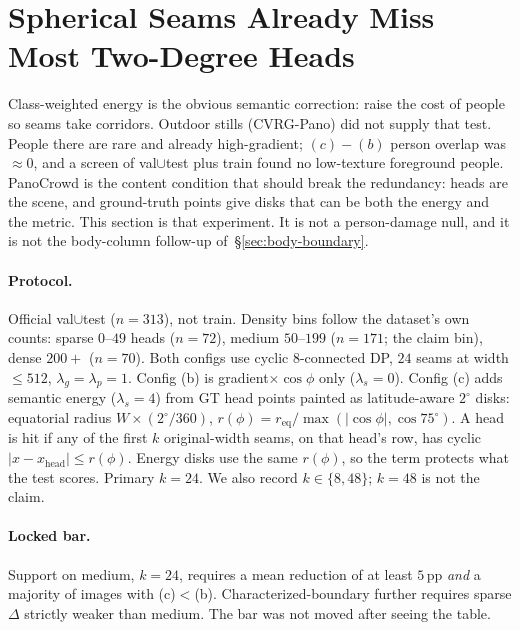 
\section{Spherical Seams Already Miss Most Two-Degree Heads}
\label{sec:head-disks}

Class-weighted energy is the obvious semantic correction: raise the cost
of people so seams take corridors. Outdoor stills (CVRG-Pano) did not
supply that test. People there are rare and already high-gradient;
$(c)-(b)$ person overlap was $\approx 0$, and a screen of val$\cup$test
plus train found no low-texture foreground people. PanoCrowd is the
content condition that should break the redundancy: heads are the scene,
and ground-truth points give disks that can be both the energy and the
metric. This section is that experiment. It is not a person-damage
null, and it is not the body-column follow-up of~\S\ref{sec:body-boundary}.

\paragraph{Protocol.}
Official val$\cup$test ($n=313$), not train. Density bins follow the
dataset's own counts: sparse $0$--$49$ heads ($n=72$), medium $50$--$199$
($n=171$; the claim bin), dense $200+$ ($n=70$). Both configs use cyclic
$8$-connected DP, $24$ seams at width $\le 512$, $\lambda_g=\lambda_p=1$.
Config (b) is gradient$\times\cos\phi$ only ($\lambda_s=0$). Config (c)
adds semantic energy ($\lambda_s=4$) from GT head points painted as
latitude-aware $2^\circ$ disks: equatorial radius $W\times(2^\circ/360)$,
$r(\phi)=r_{\mathrm{eq}}/\max(|\cos\phi|,\cos 75^\circ)$. A head is hit
if any of the first $k$ original-width seams, on that head's row, has
cyclic $|x-x_{\mathrm{head}}|\le r(\phi)$. Energy disks use the same
$r(\phi)$, so the term protects what the test scores. Primary $k=24$.
We also record $k\in\{8,48\}$; $k=48$ is not the claim.

\paragraph{Locked bar.}
Support on medium, $k=24$, requires a mean reduction of at least $5$\,pp
\emph{and} a majority of images with (c)$<$(b). Characterized-boundary
further requires sparse $\Delta$ strictly weaker than medium. The bar
was not moved after seeing the table.

